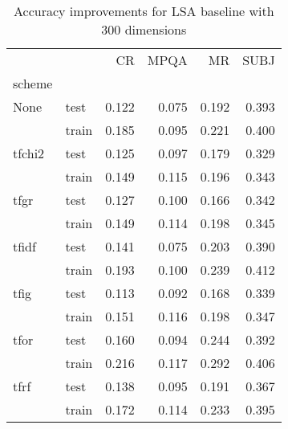 \begin{table}[h]
\begin{center}

\begin{tabular}{llrrrr}
\toprule
{} &      &  CR &  MPQA &  MR &  SUBJ \\
scheme &  &            &              &            &              \\
\midrule
None & test &      0.122 &        0.075 &      0.192 &        0.393 \\
{} & train &      0.185 &        0.095 &      0.221 &        0.400 \\
tfchi2 & test &      0.125 &        0.097 &      0.179 &        0.329 \\
{} & train &      0.149 &        0.115 &      0.196 &        0.343 \\
tfgr & test &      0.127 &        0.100 &      0.166 &        0.342 \\
{} & train &      0.149 &        0.114 &      0.198 &        0.345 \\
tfidf & test &      0.141 &        0.075 &      0.203 &        0.390 \\
{} & train &      0.193 &        0.100 &      0.239 &        0.412 \\
tfig & test &      0.113 &        0.092 &      0.168 &        0.339 \\
{} & train &      0.151 &        0.116 &      0.198 &        0.347 \\
tfor & test &      0.160 &        0.094 &      0.244 &        0.392 \\
{} & train &      0.216 &        0.117 &      0.292 &        0.406 \\
tfrf & test &      0.138 &        0.095 &      0.191 &        0.367 \\
{} & train &      0.172 &        0.114 &      0.233 &        0.395 \\
\bottomrule
\end{tabular}

\caption[Accuracy improvements for LSA baseline with 300 dimensions]{Accuracy improvements for LSA baseline with 300 dimensions}
\label{tab:lsa:resuts:300}
\end{center}
\end{table}





